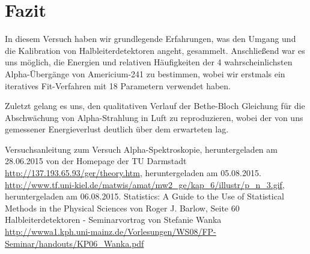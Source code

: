 \documentclass[bigchapter,colorback,accentcolor=tud4b,linedtoc,11pt]{tudreport}
\begin{document}
\chapter{Fazit}
In diesem Versuch haben wir grundlegende Erfahrungen, was den Umgang und die
Kalibration von Halbleiterdetektoren angeht, gesammelt. Anschließend war es uns
möglich, die Energien und relativen Häufigkeiten der 4 wahrscheinlichsten Alpha-Übergänge von
Americium-241 zu bestimmen, wobei wir erstmals ein iteratives Fit-Verfahren mit
18 Parametern verwendet haben.

Zuletzt gelang es uns, den qualitativen Verlauf der Bethe-Bloch Gleichung für
die Abschwächung von Alpha-Strahlung in Luft zu reproduzieren, wobei der von uns
gemessener Energieverlust deutlich über dem erwarteten lag.
\cleardoublepage{}
\newpage
\begin{thebibliography}{100}
   Versuchsanleitung zum Versuch Alpha-Spektroskopie, heruntergeladen am 28.06.2015 von der Homepage der TU Darmstadt
  \url{http://137.193.65.93/ger/theory.htm}, heruntergeladen am 05.08.2015.
  \url{http://www.tf.uni-kiel.de/matwis/amat/mw2_ge/kap_6/illustr/p_n_3.gif}, heruntergeladen am 06.08.2015.
   Statistics: A Guide to the Use of Statistical Methods in the
    Physical Sciences von Roger J. Barlow, Seite 60
   Halbleiterdetektoren - Seminarvortrag von Stefanie Wanka \url{http://wwwa1.kph.uni-mainz.de/Vorlesungen/WS08/FP-Seminar/handouts/KP06_Wanka.pdf}
\end{thebibliography}
\end{document}
